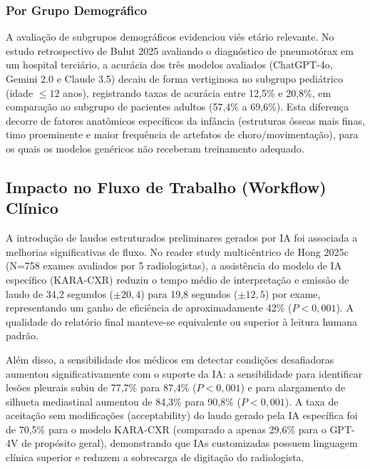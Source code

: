 \documentclass[12pt,a4paper]{article}
\begin{document}
\subsubsection{Por Grupo Demográfico}
A avaliação de subgrupos demográficos evidenciou viés etário relevante. No estudo retrospectivo de Bulut 2025 \cite{bulut} avaliando o diagnóstico de pneumotórax em um hospital terciário, a acurácia dos três modelos avaliados (ChatGPT-4o, Gemini 2.0 e Claude 3.5) decaiu de forma vertiginosa no subgrupo pediátrico (idade $\le 12$ anos), registrando taxas de acurácia entre 12,5\% e 20,8\%, em comparação ao subgrupo de pacientes adultos (57,4\% a 69,6\%). Esta diferença decorre de fatores anatômicos específicos da infância (estruturas ósseas mais finas, timo proeminente e maior frequência de artefatos de choro/movimentação), para os quais os modelos genéricos não receberam treinamento adequado.

\subsection{Impacto no Fluxo de Trabalho (Workflow) Clínico}
A introdução de laudos estruturados preliminares gerados por IA foi associada a melhorias significativas de fluxo. No reader study multicêntrico de Hong 2025c \cite{hong2025c} (N=758 exames avaliados por 5 radiologistas), a assistência do modelo de IA específico (KARA-CXR) reduziu o tempo médio de interpretação e emissão de laudo de 34,2 segundos ($\pm 20,4$) para 19,8 segundos ($\pm 12,5$) por exame, representando um ganho de eficiência de aproximadamente 42\% ($P < 0,001$). A qualidade do relatório final manteve-se equivalente ou superior à leitura humana padrão. 

Além disso, a sensibilidade dos médicos em detectar condições desafiadoras aumentou significativamente com o suporte da IA: a sensibilidade para identificar lesões pleurais subiu de 77,7\% para 87,4\% ($P < 0,001$) e para alargamento de silhueta mediastinal aumentou de 84,3\% para 90,8\% ($P < 0,001$). A taxa de aceitação sem modificações (acceptability) do laudo gerado pela IA específica foi de 70,5\% para o modelo KARA-CXR (comparado a apenas 29,6\% para o GPT-4V de propósito geral), demonstrando que IAs customizadas possuem linguagem clínica superior e reduzem a sobrecarga de digitação do radiologista.
\end{document}

